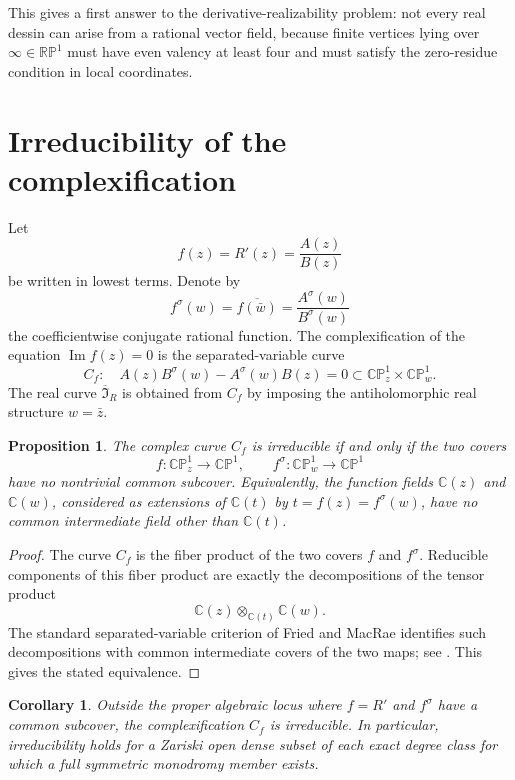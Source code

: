 \documentclass[11pt,reqno]{amsart}
\newtheorem{proposition}[theorem]{Proposition}
\newtheorem{corollary}[theorem]{Corollary}
\theoremstyle{definition}
\theoremstyle{remark}
\newcommand{\C}{\mathbb C}
\newcommand{\CP}{\mathbb {CP}}
\newcommand{\RP}{\mathbb {RP}}
\newcommand{\I}{\mathfrak I}
\renewcommand{\Im}{\operatorname{Im}}
\begin{document}
This gives a first answer to the derivative-realizability problem: not every real dessin can arise from a rational vector field, because finite vertices lying over $\infty\in\RP^1$ must have even valency at least four and must satisfy the zero-residue condition in local coordinates.

\section{Irreducibility of the complexification}

Let
\[
        f(z)=R'(z)=\frac{A(z)}{B(z)}
\]
be written in lowest terms.  Denote by
\[
        f^\sigma(w)=\overline{f(\bar w)}
        =\frac{A^\sigma(w)}{B^\sigma(w)}
\]
the coefficientwise conjugate rational function.  The complexification of the equation $\Im f(z)=0$ is the separated-variable curve
\begin{equation}\label{eq:complexification}
        C_f:\quad A(z)B^\sigma(w)-A^\sigma(w)B(z)=0
        \subset \CP^1_z\times\CP^1_w.
\end{equation}
The real curve $\overline{\I}_R$ is obtained from $C_f$ by imposing the antiholomorphic real structure $w=\bar z$.

\begin{proposition}\label{prop:irreducibility-criterion}
The complex curve $C_f$ is irreducible if and only if the two covers
\[
        f:\CP^1_z\to\CP^1,
        \qquad
        f^\sigma:\CP^1_w\to\CP^1
\]
have no nontrivial common subcover.  Equivalently, the function fields $\C(z)$ and $\C(w)$, considered as extensions of $\C(t)$ by $t=f(z)=f^\sigma(w)$, have no common intermediate field other than $\C(t)$.
\end{proposition}

\begin{proof}
The curve $C_f$ is the fiber product of the two covers $f$ and $f^\sigma$.  Reducible components of this fiber product are exactly the decompositions of the tensor product
\[
        \C(z)\otimes_{\C(t)}\C(w).
\]
The standard separated-variable criterion of Fried and MacRae identifies such decompositions with common intermediate covers of the two maps; see \cite{FriedMacRae}.  This gives the stated equivalence.
\end{proof}

\begin{corollary}\label{cor:generic-irreducible}
Outside the proper algebraic locus where $f=R'$ and $f^\sigma$ have a common subcover, the complexification $C_f$ is irreducible. In particular, irreducibility holds for a Zariski open dense subset of each exact degree class for which a full symmetric monodromy member exists.
\end{corollary}
\end{document}
